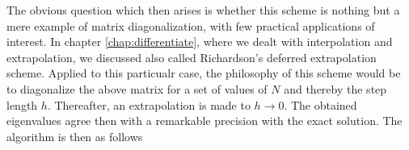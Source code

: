 The obvious question which then arises is whether this scheme is nothing 
but  a mere example of matrix diagonalization, with few 
practical applications of interest.  In chapter \ref{chap:differentiate}, where we dealt
with interpolation and extrapolation, we discussed also called
Richardson's deferred extrapolation
scheme. Applied to this particualr case, the philosophy of this scheme would be  
to diagonalize the above
matrix for a set of values of $N$ and thereby the step length 
$h$. Thereafter, an extrapolation is made to $h\rightarrow 0$.
The obtained eigenvalues agree then with a remarkable precision
with the exact solution.
The algorithm is then as follows
\begin{center}
\end{center}

